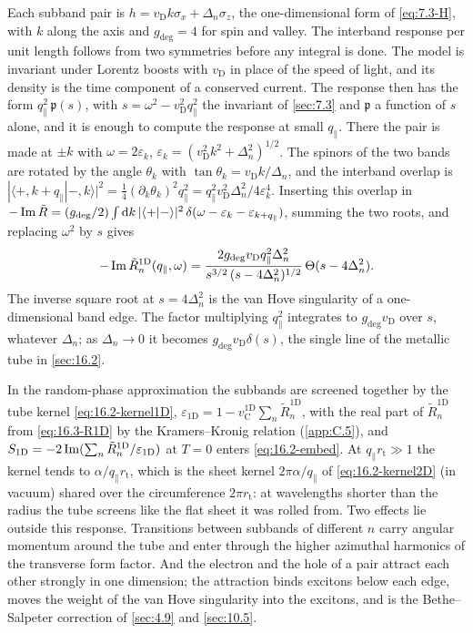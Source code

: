 Each subband pair is $h = v_{\mathrm{D}}k\sigma_x + \Delta_n\sigma_z$, the one-dimensional form of \cref{eq:7.3-H}, with $k$ along the axis and $g_{\mathrm{deg}} = 4$ for spin and valley. The interband response per unit length follows from two symmetries before any integral is done. The model is invariant under Lorentz boosts with $v_{\mathrm{D}}$ in place of the speed of light, and its density is the time component of a conserved current. The response then has the form $q_\parallel^2\,\mathfrak{p}(s)$, with $s = \omega^2 - v_{\mathrm{D}}^2q_\parallel^2$ the invariant of \cref{sec:7.3} and $\mathfrak{p}$ a function of $s$ alone, and it is enough to compute the response at small $q_\parallel$. There the pair is made at $\pm k$ with $\omega = 2\varepsilon_k$, $\varepsilon_k = (v_{\mathrm{D}}^2k^2 + \Delta_n^2)^{1/2}$. The spinors of the two bands are rotated by the angle $\theta_k$ with $\tan\theta_k = v_{\mathrm{D}}k/\Delta_n$, and the interband overlap is $|\langle +,k + q_\parallel|-,k\rangle|^2 = \tfrac14(\partial_k\theta_k)^2q_\parallel^2 = q_\parallel^2v_{\mathrm{D}}^2\Delta_n^2/4\varepsilon_k^4$. Inserting this overlap in $-\operatorname{Im}\tilde R = (g_{\mathrm{deg}}/2)\int\mathrm{d} k\,|\langle +|-\rangle|^2\,\delta(\omega - \varepsilon_k - \varepsilon_{k+q_\parallel})$, summing the two roots, and replacing $\omega^2$ by $s$ gives
\begin{equation}
  -\operatorname{Im}\tilde R^{\mathrm{1D}}_n(q_\parallel,\omega) = \frac{2g_{\mathrm{deg}}v_{\mathrm{D}}q_\parallel^2\Delta_n^2}{s^{3/2}\,(s - 4\Delta_n^2)^{1/2}}\,\Theta(s - 4\Delta_n^2) .
  \label{eq:16.3-R1D}
\end{equation}
The inverse square root at $s = 4\Delta_n^2$ is the van Hove singularity of a one-dimensional band edge. The factor multiplying $q_\parallel^2$ integrates to $g_{\mathrm{deg}}v_{\mathrm{D}}$ over $s$, whatever $\Delta_n$; as $\Delta_n \to 0$ it becomes $g_{\mathrm{deg}}v_{\mathrm{D}}\delta(s)$, the single line of the metallic tube in \cref{sec:16.2}.

In the random-phase approximation the subbands are screened together by the tube kernel \cref{eq:16.2-kernel1D}, $\varepsilon_{\mathrm{1D}} = 1 - v_{\mathrm{C}}^{\mathrm{1D}}\sum_n\tilde R^{\mathrm{1D}}_n$, with the real part of $\tilde R^{\mathrm{1D}}_n$ from \cref{eq:16.3-R1D} by the Kramers--Kronig relation (\cref{app:C.5}), and $S_{\mathrm{1D}} = -2\operatorname{Im}(\sum_n\tilde R^{\mathrm{1D}}_n/\varepsilon_{\mathrm{1D}})$ at $T = 0$ enters \cref{eq:16.2-embed}. At $q_\parallel r_{\mathrm{t}} \gg 1$ the kernel tends to $\alpha/q_\parallel r_{\mathrm{t}}$, which is the sheet kernel $2\pi\alpha/q_\parallel$ of \cref{eq:16.2-kernel2D} (in vacuum) shared over the circumference $2\pi r_{\mathrm{t}}$: at wavelengths shorter than the radius the tube screens like the flat sheet it was rolled from. Two effects lie outside this response. Transitions between subbands of different $n$ carry angular momentum around the tube and enter through the higher azimuthal harmonics of the transverse form factor. And the electron and the hole of a pair attract each other strongly in one dimension; the attraction binds excitons below each edge, moves the weight of the van Hove singularity into the excitons, and is the Bethe--Salpeter correction of \cref{sec:4.9} and \cref{sec:10.5}.

